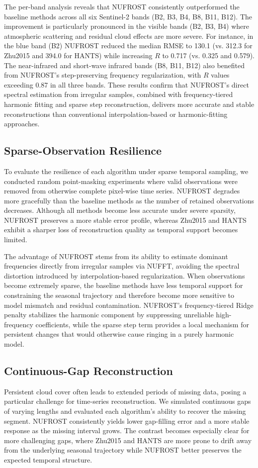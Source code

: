 \documentclass[letterpaper,journal]{IEEEtran}
\begin{document}
The per-band analysis reveals that NUFROST consistently outperformed the baseline methods across all six Sentinel-2 bands (B2, B3, B4, B8, B11, B12). The improvement is particularly pronounced in the visible bands (B2, B3, B4) where atmospheric scattering and residual cloud effects are more severe. For instance, in the blue band (B2) NUFROST reduced the median RMSE to 130.1 (vs. 312.3 for Zhu2015 and 394.0 for HANTS) while increasing $R$ to 0.717 (vs. 0.325 and 0.579). The near-infrared and short-wave infrared bands (B8, B11, B12) also benefited from NUFROST's step-preserving frequency regularization, with $R$ values exceeding 0.87 in all three bands. These results confirm that NUFROST's direct spectral estimation from irregular samples, combined with frequency-tiered harmonic fitting and sparse step reconstruction, delivers more accurate and stable reconstructions than conventional interpolation-based or harmonic-fitting approaches.

\subsection{Sparse-Observation Resilience}
To evaluate the resilience of each algorithm under sparse temporal sampling, we conducted random point-masking experiments where valid observations were removed from otherwise complete pixel-wise time series. NUFROST degrades more gracefully than the baseline methods as the number of retained observations decreases. Although all methods become less accurate under severe sparsity, NUFROST preserves a more stable error profile, whereas Zhu2015 and HANTS exhibit a sharper loss of reconstruction quality as temporal support becomes limited.

The advantage of NUFROST stems from its ability to estimate dominant frequencies directly from irregular samples via NUFFT, avoiding the spectral distortion introduced by interpolation-based regularization. When observations become extremely sparse, the baseline methods have less temporal support for constraining the seasonal trajectory and therefore become more sensitive to model mismatch and residual contamination. NUFROST's frequency-tiered Ridge penalty stabilizes the harmonic component by suppressing unreliable high-frequency coefficients, while the sparse step term provides a local mechanism for persistent changes that would otherwise cause ringing in a purely harmonic model.

\subsection{Continuous-Gap Reconstruction}
Persistent cloud cover often leads to extended periods of missing data, posing a particular challenge for time-series reconstruction. We simulated continuous gaps of varying lengths and evaluated each algorithm's ability to recover the missing segment. NUFROST consistently yields lower gap-filling error and a more stable response as the missing interval grows. The contrast becomes especially clear for more challenging gaps, where Zhu2015 and HANTS are more prone to drift away from the underlying seasonal trajectory while NUFROST better preserves the expected temporal structure.
\end{document}
